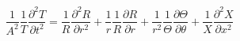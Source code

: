 \begin{equation}
    \frac{1}{A^2} \frac{1}{T}\frac{\partial^2 T}{\partial t^2} = 
    \frac{1}{R}\frac{\partial^2 R}{\partial r^2 } +
    \frac{1}{r}\frac{1}{R}\frac{\partial R}{\partial r}  + 
    \frac{1}{r^2}\frac{1}{\Theta}\frac{\partial \Theta}{\partial \theta} + 
    \frac{1}{X}\frac{\partial^2 X}{\partial x^2}
    \label{eqn:waveode}
\end{equation}











